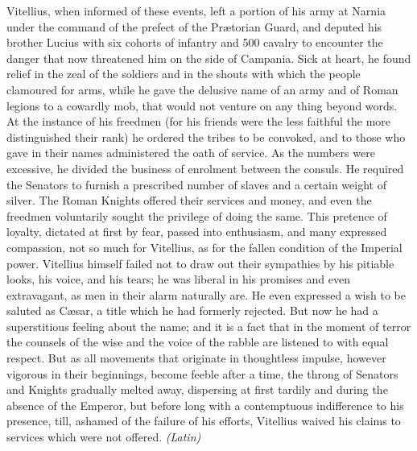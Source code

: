 Vitellius, when informed of these events, left a portion of his army at Narnia under the command of the prefect of the Prætorian Guard, and deputed his brother Lucius with six cohorts of infantry and 500 cavalry to encounter the danger that now threatened him on the side of Campania. Sick at heart, he found relief in the zeal of the soldiers and in the shouts with which the people clamoured for arms, while he gave the delusive name of an army and of Roman legions to a cowardly mob, that would not venture on any thing beyond words. At the instance of his freedmen (for his friends were the less faithful the more distinguished their rank) he ordered the tribes to be convoked, and to those who gave in their names administered the oath of service. As the numbers were excessive, he divided the business of enrolment between the consuls. He required the Senators to furnish a prescribed number of slaves and a certain weight of silver. The Roman Knights offered their services and money, and even the freedmen voluntarily sought the privilege of doing the same. This pretence of loyalty, dictated at first by fear, passed into enthusiasm, and many expressed compassion, not so much for Vitellius, as for the fallen condition of the Imperial power. Vitellius himself failed not to draw out their sympathies by his pitiable looks, his voice, and his tears; he was liberal in his promises and even extravagant, as men in their alarm naturally are. He even expressed a wish to be saluted as Cæsar, a title which he had formerly rejected. But now he had a superstitious feeling about the name; and it is a fact that in the moment of terror the counsels of the wise and the voice of the rabble are listened to with equal respect. But as all movements that originate in thoughtless impulse, however vigorous in their beginnings, become feeble after a time, the throng of Senators and Knights gradually melted away, dispersing at first tardily and during the absence of the Emperor, but before long with a contemptuous indifference to his presence, till, ashamed of the failure of his efforts, Vitellius waived his claims to services which were not offered. \emph{(Latin)}


